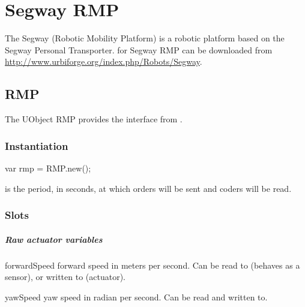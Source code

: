 
\chapter{Segway RMP}
\label{sec:segway-rmp}

The Segway  (Robotic Mobility Platform) is a robotic platform based
on the Segway Personal Transporter.  \urbi for Segway RMP can be downloaded
from \url{http://www.urbiforge.org/index.php/Robots/Segway}.

\section{RMP}

The UObject RMP provides the interface from \urbi.

\subsection{Instantiation}

\begin{urbiunchecked}
var rmp = RMP.new();
\end{urbiunchecked}

 is the period, in seconds, at which orders will be sent and
coders will be read.

\subsection{Slots}

\paragraph{Raw actuator variables}

\begin{urbiscriptapi}
\item[forwardSpeed] forward speed in meters per second.  Can be read to
  (behaves as a sensor), or written to (actuator).
\item[yawSpeed] yaw speed in radian per second.  Can be read and written
  to.
\end{urbiscriptapi}

